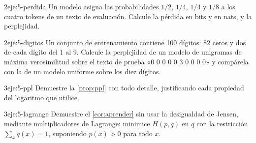 \begin{ejercicio}{2}{eje:5-perdida}
Un modelo asigna las probabilidades $1/2$, $1/4$, $1/4$ y $1/8$ a los cuatro tokens de un texto de evaluación. Calcule la pérdida en bits y en nats, y la perplejidad.
\end{ejercicio}

\begin{ejercicio}{2}{eje:5-digitos}
Un conjunto de entrenamiento contiene 100 dígitos: 82 ceros y dos de cada dígito del 1 al 9. Calcule la perplejidad de un modelo de unigramas de máxima verosimilitud sobre el texto de prueba «0 0 0 0 0 3 0 0 0 0» y compárela con la de un modelo uniforme sobre los diez dígitos.
\end{ejercicio}

\begin{ejercicio}{3}{eje:5-ppl}
Demuestre la \cref{prop:ppl} con todo detalle, justificando cada propiedad del logaritmo que utilice.
\end{ejercicio}

\begin{ejercicio}{3}{eje:5-lagrange}
Demuestre el \cref{cor:aprender} sin usar la desigualdad de Jensen, mediante multiplicadores de Lagrange: minimice $H(p,q)$ en $q$ con la restricción $\sum_x q(x)=1$, suponiendo $p(x)>0$ para todo $x$.
\end{ejercicio}
